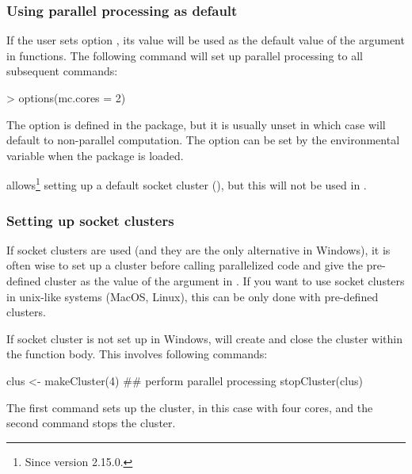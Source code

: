 \documentclass[a4paper,10pt,twocolumn]{article}
\begin{document}
\subsubsection{Using parallel processing as default}
\label{sec:parallel:default}

If the user sets option , its value will be used as the
default value of the  argument in 
functions.  The following command will set up parallel processing to
all subsequent  commands:
\begin{Schunk}
\begin{Sinput}
> options(mc.cores = 2)
\end{Sinput}
\end{Schunk}

The  option is defined in the  package,
but it is usually unset in which case  will default to
non-parallel computation.  The  option can be set by
the environmental variable  when the 
package is loaded.

\R{} allows\footnote{Since \R{} version 2.15.0.}
setting up a default socket cluster (), but
this will not be used in . 

\subsubsection{Setting up socket clusters}
\label{sec:parallel:socket}

If socket clusters are used (and they are the only alternative in
Windows), it is often wise to set up a cluster before calling
parallelized code and give the pre-defined cluster as the value of
the  argument in .  If you want to use
socket clusters in unix-like systems (MacOS, Linux), this can be only
done with pre-defined clusters.

If socket cluster is not set up in Windows,  will create and
close the cluster within the function body. This involves following commands:
\begin{Schunk}
\begin{Soutput}
clus <- makeCluster(4)
## perform parallel processing
stopCluster(clus)
\end{Soutput}
\end{Schunk}
The first command sets up the cluster, in this case with four
cores, and the second command stops the cluster.
\end{document}
